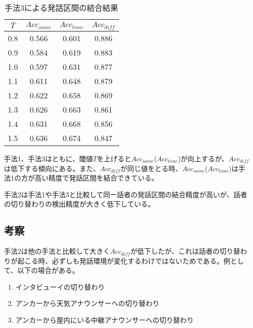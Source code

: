 \begin{table}[H]
\begin{center}
\caption{手法3による発話区間の結合結果 \label{table:result_prob3}}
\begin{tabular}{|c|c|c|c|}
\hline
$T$   & $Acc_{same}$ & $Acc_{time}$ & $Acc_{diff}$ \\ \hline
0.8 & 0.566    & 0.601    & 0.886    \\ \hline
0.9 & 0.584    & 0.619    & 0.883    \\ \hline
1.0 & 0.597    & 0.631    & 0.877    \\ \hline
1.1 & 0.611    & 0.648    & 0.879    \\ \hline
1.2 & 0.622    & 0.658    & 0.869    \\ \hline
1.3 & 0.626    & 0.663    & 0.861    \\ \hline
1.4 & 0.631    & 0.668    & 0.856    \\ \hline
1.5 & 0.636    & 0.674    & 0.847    \\ \hline
\end{tabular}
\end{center}
\end{table}

手法1、手法3はともに、閾値$T$を上げると$Acc_{same}$($Acc_{time}$)が向上するが、$Acc_{diff}$は低下する傾向にある。また、$Acc_{diff}$が同じ値をとる時、$Acc_{same}$($Acc_{time}$)は手法1の方が高い精度で発話区間を結合できている。\par
手法2は手法1や手法3と比較して同一話者の発話区間の結合精度が高いが、話者の切り替わりの検出精度が大きく低下している。

\subsection{考察}
手法2は他の手法と比較して大きく$Acc_{diff}$が低下したが、これは話者の切り替わりが起こる時、必ずしも発話環境が変化するわけではないためである。例として、以下の場合がある。

\begin{enumerate}
\item インタビューイの切り替わり
\item アンカーから天気アナウンサーへの切り替わり
\item アンカーから屋内にいる中継アナウンサーへの切り替わり
\end{enumerate}


